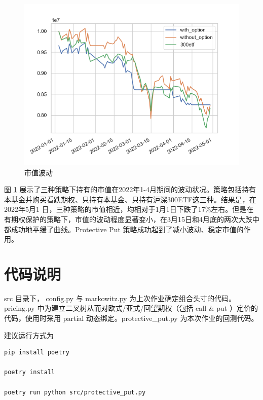\documentclass[a4paper,12pt]{ctexart}
\begin{document}
\begin{figure}[h]
    \centering
    \includegraphics[width=0.8\linewidth]{./lib/result/result.png}
    \caption{市值波动}
    \label{fig:300}
\end{figure}
	
图 \ref{fig:300} 展示了三种策略下持有的市值在2022年1-4月期间的波动状况。策略包括持有本基金并购买看跌期权、只持有本基金、只持有沪深300ETF这三种。结果是，在2022年5月1 日，三种策略的市值相近，均相对于1月1日下跌了17\%左右。但是在有期权保护的策略下，市值的波动程度显著变小，在3月15日和4月底的两次大跌中都成功地平缓了曲线。Protective Put 策略成功起到了减小波动、稳定市值的作用。
 

\appendix
\section{代码说明}

src 目录下， config.py 与 markowitz.py 为上次作业确定组合头寸的代码。
pricing.py 中为建立二叉树从而对欧式/亚式/回望期权（包括 call \& put ）定价的代码，使用时采用 partial 动态绑定。protective\_put.py 为本次作业的回测代码。

建议运行方式为
\begin{verbatim}
pip install poetry

poetry install 

poetry run python src/protective_put.py
\end{verbatim}
\end{document}

